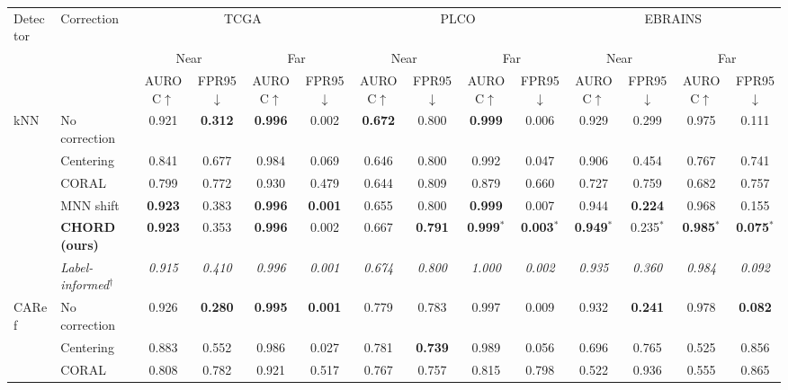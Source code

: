 \begin{tabular}{llcccccccccccc}
\toprule
Detector & Correction & \multicolumn{4}{c}{TCGA} & \multicolumn{4}{c}{PLCO} & \multicolumn{4}{c}{EBRAINS} \\
\cmidrule(lr){3-6}\cmidrule(lr){7-10}\cmidrule(lr){11-14}
 & & \multicolumn{2}{c}{Near} & \multicolumn{2}{c}{Far} & \multicolumn{2}{c}{Near} & \multicolumn{2}{c}{Far} & \multicolumn{2}{c}{Near} & \multicolumn{2}{c}{Far} \\
\cmidrule(lr){3-4}\cmidrule(lr){5-6}\cmidrule(lr){7-8}\cmidrule(lr){9-10}\cmidrule(lr){11-12}\cmidrule(lr){13-14}
 & & AUROC$\uparrow$ & FPR95$\downarrow$ & AUROC$\uparrow$ & FPR95$\downarrow$ & AUROC$\uparrow$ & FPR95$\downarrow$ & AUROC$\uparrow$ & FPR95$\downarrow$ & AUROC$\uparrow$ & FPR95$\downarrow$ & AUROC$\uparrow$ & FPR95$\downarrow$ \\
\midrule
kNN & No correction & 0.921 & \textbf{0.312} & \textbf{0.996} & 0.002 & \textbf{0.672} & 0.800 & \textbf{0.999} & 0.006 & 0.929 & 0.299 & 0.975 & 0.111 \\
 & Centering & 0.841 & 0.677 & 0.984 & 0.069 & 0.646 & 0.800 & 0.992 & 0.047 & 0.906 & 0.454 & 0.767 & 0.741 \\
 & CORAL & 0.799 & 0.772 & 0.930 & 0.479 & 0.644 & 0.809 & 0.879 & 0.660 & 0.727 & 0.759 & 0.682 & 0.757 \\
 & MNN shift & \textbf{0.923} & 0.383 & \textbf{0.996} & \textbf{0.001} & 0.655 & 0.800 & \textbf{0.999} & 0.007 & 0.944 & \textbf{0.224} & 0.968 & 0.155 \\
 & \textbf{CHORD (ours)} & \textbf{0.923} & 0.353 & \textbf{0.996} & 0.002 & 0.667 & \textbf{0.791} & \textbf{0.999$^{*}$} & \textbf{0.003$^{*}$} & \textbf{0.949$^{*}$} & 0.235$^{*}$ & \textbf{0.985$^{*}$} & \textbf{0.075$^{*}$} \\
 & \textit{Label-informed$^\dagger$} & \textit{0.915} & \textit{0.410} & \textit{0.996} & \textit{0.001} & \textit{0.674} & \textit{0.800} & \textit{1.000} & \textit{0.002} & \textit{0.935} & \textit{0.360} & \textit{0.984} & \textit{0.092} \\
\midrule
CARef & No correction & 0.926 & \textbf{0.280} & \textbf{0.995} & \textbf{0.001} & 0.779 & 0.783 & 0.997 & 0.009 & 0.932 & \textbf{0.241} & 0.978 & \textbf{0.082} \\
 & Centering & 0.883 & 0.552 & 0.986 & 0.027 & 0.781 & \textbf{0.739} & 0.989 & 0.056 & 0.696 & 0.765 & 0.525 & 0.856 \\
 & CORAL & 0.808 & 0.782 & 0.921 & 0.517 & 0.767 & 0.757 & 0.815 & 0.798 & 0.522 & 0.936 & 0.555 & 0.865 \\

\end{tabular}
